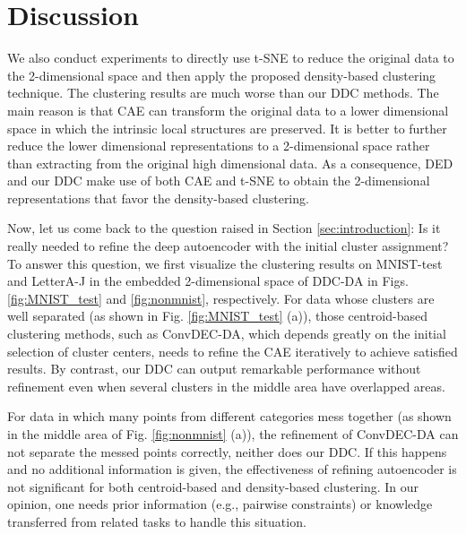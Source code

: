 \documentclass[10pt,twocolumn,letterpaper]{article}
\begin{document}
\section{Discussion}\label{sec:Discussion}
We also conduct experiments to directly use t-SNE to reduce the original data to the 2-dimensional space and then apply the proposed density-based clustering technique. The clustering results are much worse than our DDC methods. The main reason is that CAE can transform the original data to a lower dimensional space in which the intrinsic local structures are preserved. It is better to further reduce the lower dimensional representations to a 2-dimensional space rather than extracting from the original high dimensional data. 
As a consequence, DED \cite{Wang2018DED} and our DDC make use of both CAE and t-SNE to obtain the 2-dimensional representations that favor the density-based clustering.


Now, let us come back to the question raised in Section \ref{sec:introduction}: Is it really needed to refine the deep autoencoder with the initial cluster assignment? 
To answer this question, we first visualize the clustering results on MNIST-test and LetterA-J in the embedded 2-dimensional space of DDC-DA in Figs. \ref{fig:MNIST_test} and \ref{fig:nonmnist}, respectively. 
For data whose clusters are well separated (as shown in Fig. \ref{fig:MNIST_test} (a)), those centroid-based clustering methods, such as ConvDEC-DA, which depends greatly on the initial selection of cluster centers, needs to refine the CAE iteratively to achieve satisfied results.
By contrast, our DDC can output remarkable performance without refinement even when several clusters in the middle area have overlapped areas.

For data in which many points from different categories mess together (as shown in the middle area of Fig. \ref{fig:nonmnist} (a)), the refinement of ConvDEC-DA can not separate the messed points correctly, neither does our DDC. 
If this happens and no additional information is given, the effectiveness of refining autoencoder is not significant for both centroid-based and density-based clustering.
In our opinion, one needs prior information (e.g., pairwise constraints) or knowledge transferred from related tasks to handle this situation. 
\end{document}
